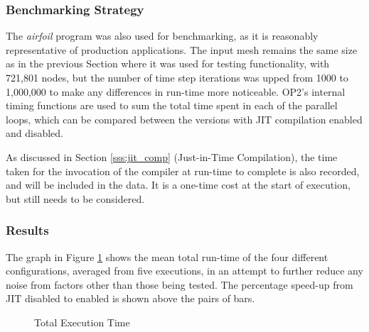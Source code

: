\subsubsection{Benchmarking Strategy}
The \textit{airfoil} program was also used for benchmarking, as it is reasonably representative of production applications. The input mesh remains the same size as in the previous Section where it was used for testing functionality, with 721,801 nodes, but the number of time step iterations was upped from 1000 to 1,000,000 to make any differences in run-time more noticeable. OP2's internal timing functions are used to sum the total time spent in each of the parallel loops, which can be compared between the versions with JIT compilation enabled and disabled.
\par
As discussed in Section \ref{sss:jit_comp} (Just-in-Time Compilation), the time taken for the invocation of the compiler at run-time to complete is also recorded, and will be included in the data. It is a one-time cost at the start of execution, but still needs to be considered.
\clearpage
\subsubsection{Results}
The graph in Figure \ref{fig:res_total} shows the mean total run-time of the four different configurations, averaged from five executions, in an attempt to further reduce any noise from factors other than those being tested. The percentage speed-up from JIT disabled to enabled is shown above the pairs of bars.

\begin{figure}[h!]
\begin{center}
\caption{Total Execution Time}
\label{fig:res_total}
\pgfplotsset{width=.6\linewidth,compat=1.8}
\end{center}
\vspace{-1cm}
\end{figure}

